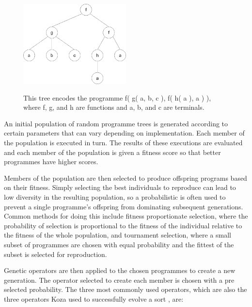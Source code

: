 \documentclass{article}
\begin{document}
			\begin{figure}
				\centering
				\includegraphics[width=0.5\textwidth]{1_gp_example_tree}
				\label{fig:ex_prog_tree}
				\caption{This tree encodes the programme f( g( a, b, c ), f( h( a ), a ) ), where f, g, and h are functions and a, b, and c are terminals.}
			\end{figure}
			
			An initial population of random programme trees is generated according to certain parameters that can vary depending on implementation. Each member of the population is executed in turn. The results of these executions are evaluated and each member of the population is given a fitness score so that better programmes have higher scores.
		
			Members of the population are then selected to produce offspring programs based on their fitness. Simply selecting the best individuals to reproduce can lead to low diversity in the resulting population, so a probabilistic is often used to prevent a single programme's offspring from dominating subsequent generations.
			Common methods for doing this include fitness proportionate selection, where the probability of selection is proportional to the fitness of the individual relative to the fitness of the whole population, and tournament selection, where a small subset of programmes are chosen with equal probability and the fittest of the subset is selected for reproduction.
			
			Genetic operators are then applied to the chosen programmes to create a new generation. The operator selected to create each member is chosen with a pre selected probability. The three most commonly used operators, which are also the three operators Koza used to successfully evolve a sort \cite{kinnear_evolving_1993}, are:
			
\end{document}
